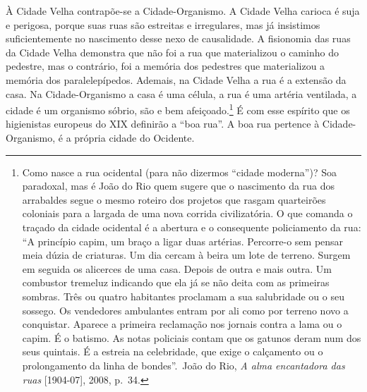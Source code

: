 À Cidade Velha contrapõe-se a Cidade-Organismo. A Cidade Velha carioca é
suja e perigosa, porque suas ruas são estreitas e irregulares, mas já
insistimos suficientemente no nascimento desse nexo de causalidade. A
fisionomia das ruas da Cidade Velha demonstra que não foi a rua que
materializou o caminho do pedestre, mas o contrário, foi a memória dos
pedestres que materializou a memória dos paralelepípedos. Ademais, na
Cidade Velha a rua é a extensão da casa. Na Cidade-Organismo a casa é
uma célula, a rua é uma artéria ventilada, a cidade é um organismo
sóbrio, são e bem afeiçoado.\footnote{Como nasce a rua ocidental (para
  não dizermos ``cidade moderna'')? Soa paradoxal, mas é João do Rio
  quem sugere que o nascimento da rua dos arrabaldes segue o mesmo
  roteiro dos projetos que rasgam quarteirões coloniais para a largada
  de uma nova corrida civilizatória. O que comanda o traçado da cidade
  ocidental é a abertura e o consequente policiamento da rua: ``A
  princípio capim, um braço a ligar duas artérias. Percorre-o sem pensar
  meia dúzia de criaturas. Um dia cercam à beira um lote de terreno.
  Surgem em seguida os alicerces de uma casa. Depois de outra e mais
  outra. Um combustor tremeluz indicando que ela já se não deita com as
  primeiras sombras. Três ou quatro habitantes proclamam a sua
  salubridade ou o seu sossego. Os vendedores ambulantes entram por ali
  como por terreno novo a conquistar. Aparece a primeira reclamação nos
  jornais contra a lama ou o capim. É o batismo. As notas policiais
  contam que os gatunos deram num dos seus quintais. É a estreia na
  celebridade, que exige o calçamento ou o prolongamento da linha de
  bondes''.~João do Rio, \emph{A alma encantadora das ruas}
  {[}1904-07{]}, 2008, p.~34.} É com esse espírito que os higienistas
europeus do XIX definirão a ``boa rua''. A boa rua pertence à
Cidade-Organismo, é a própria cidade do Ocidente.


